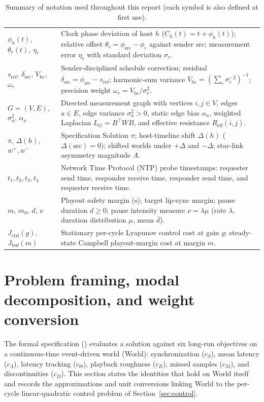 \documentclass[11pt,a4paper]{article}
\DeclareRobustCommand{\lean}[1]{{\ttfamily\def\_{\textunderscore\allowbreak}#1}}
\theoremstyle{definition}
\begin{document}
\begin{table}[htb]
\begin{tabular}{@{}l >{\raggedright\arraybackslash}p{10.6cm}@{}}
$\phi_h(t)$, $\theta_r(t)$, $\eta_r$ & Clock phase deviation of host $h$ ($C_h(t) = t + \phi_h(t)$); relative offset $\theta_r = \phi_{\mathrm{src}} - \phi_r$ against sender $\mathrm{src}$; measurement error $\eta_r$ with standard deviation $\sigma_r$. \\
$s_{\mathrm{ref}}$, $\delta_{\mathrm{src}}$, $V_{\mathrm{bc}}$, $\omega_r$ & Sender-disciplined schedule correction; residual $\delta_{\mathrm{src}} = \phi_{\mathrm{src}} - s_{\mathrm{ref}}$; harmonic-sum variance $V_{\mathrm{bc}} = (\sum_r \sigma_r^{-2})^{-1}$; precision weight $\omega_r = V_{\mathrm{bc}}/\sigma_r^2$. \\
$G = (V, E)$, $\sigma_a^2$, $\alpha_a$ & Directed measurement graph with vertices $i, j \in V$, edges $a \in E$, edge variance $\sigma_a^2 > 0$, static edge bias $\alpha_a$, weighted Laplacian $L_G = B^\top W B$, and effective resistance $R_{\mathrm{eff}}(i, j)$. \\
$\pi$, $\Delta(h)$, $w^+, w^-$ & Specification \lean{Solution} $\pi$; host-timeline shift $\Delta(h)$ ($\Delta(\mathrm{src}) = 0$); shifted worlds under $+\Delta$ and $-\Delta$; star-link asymmetry magnitude $A$. \\
$t_1, t_2, t_3, t_4$ & Network Time Protocol (NTP) probe timestamps: requester send time, responder receive time, responder send time, and requester receive time. \\
$m$, $m_0$, $d$, $\nu$ & Playout safety margin ($\text{s}$); target lip-sync margin; pause duration $d \ge 0$; pause intensity measure $\nu = \lambda\mu$ (rate $\lambda$, duration distribution $\mu$, mean $\bar d$). \\
$J_{\mathrm{ctrl}}(g)$, $J_{\mathrm{buf}}(m)$ & Stationary per-cycle Lyapunov control cost at gain $g$; steady-state Campbell playout-margin cost at margin $m$. \\
\bottomrule
\end{tabular}
\caption{Summary of notation used throughout this report (each symbol is also defined at first use).}
\label{tab:notation}
\end{table}

\section{Problem framing, modal decomposition, and weight conversion}
\label{sec:framing}

The formal specification () evaluates a solution
against six long-run objectives on a continuous-time event-driven world
(\lean{World}): synchronization ($c_S$), mean latency ($c_\Lambda$), latency
tracking ($c_\Theta$), playback roughness ($c_R$), missed samples ($c_M$), and
discontinuities ($c_D$). This section states the identities that hold on
\lean{World} itself and records the approximations and unit conversions linking
\lean{World} to the per-cycle linear-quadratic control problem of
Section~\ref{sec:control}.
\end{document}

